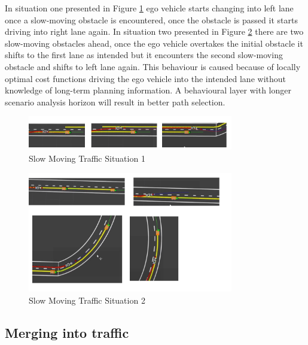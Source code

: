 \iffalse 

In situation one presented in Figure \ref{slow_moving_1} ego vehicle starts changing into left lane once a slow-moving obstacle is encountered, once the obstacle is passed it starts driving into right lane again. In situation two presented in Figure \ref{slow_moving_2} there are two slow-moving obstacles ahead, once the ego vehicle overtakes the initial obstacle it shifts to the first lane as intended but it encounters the second slow-moving obstacle and shifts to left lane again. This behaviour is caused because of locally optimal cost functions driving the ego vehicle into the intended lane without knowledge of long-term planning information. A behavioural layer with longer scenario analysis horizon will result in better path selection.


\begin{figure}[h]
    \centering
    \includegraphics[width=0.8\textwidth]{Images/evaluation/slow_moving1.jpg}
    \caption{Slow Moving Traffic Situation 1}
    \label{slow_moving_1}
\end{figure}

\begin{figure}[h]
    \centering
    \includegraphics[width=0.8\textwidth]{Images/evaluation/slow_moving2.jpg}
    \caption{Slow Moving Traffic Situation 2}
    \label{slow_moving_2}
\end{figure}



\subsection{Merging into traffic}

